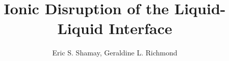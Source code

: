 \documentclass[12pt]{article}
\title{Ionic Disruption of the Liquid-Liquid Interface}
\author{Eric S. Shamay, Geraldine L. Richmond}
\begin{document}
\maketitle


\newcommand{\ang}{\,$\textrm{\AA}$}
\newcommand{\angs}{\ang}
\newcommand{\wat}{H$_2$O}
\newcommand{\ctc}{CCl$_4$}
\newcommand{\ctcwat}{CCl$_4$-H$_2$O}
\newcommand{\airwat}{air-H$_2$O}
\newcommand{\cl}{Cl$^-$}
\newcommand{\nit}{${\text{NO}_3}^-$}
\newcommand{\sul}{${\text{SO}_4}^{2-}$}
\newcommand{\nacl}{NaCl}
\newcommand{\sodnit}{NaNO$_3$}
\newcommand{\sodsul}{Na$_2$SO$_4$}
\newcommand{\costheta}{$\cos\theta$~}
\newcommand{\cosphi}{$\cos\phi$~}
\newcommand{\costhetarange}{~$<\cos\theta<$~}
\newcommand{\cosphirange}{~$<\cos\phi<$~}
\newcommand{\cm}{\,$cm^{-1}$}

\doublespacing

%










%







\end{document}
